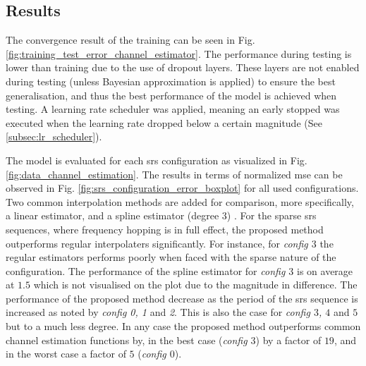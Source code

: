 


\subsection{Results}
The convergence result of the training can be seen in Fig. \ref{fig:training_test_error_channel_estimator}. The performance during testing is lower than training due to the use of dropout layers. These layers are not enabled during testing (unless Bayesian approximation is applied) to ensure the best generalisation, and thus the best performance of the model is achieved when testing. A learning rate scheduler was applied, meaning an early stopped was executed when the learning rate dropped below a certain magnitude (See \ref{subsec:lr_scheduler}).

The model is evaluated for each \gls{srs} configuration as visualized in Fig. \ref{fig:data_channel_estimation}. The results in terms of normalized \gls{mse} can be observed in Fig. \ref{fig:srs_configuration_error_boxplot} for all used configurations. Two common interpolation methods are added for comparison, more specifically, a linear estimator, and a spline estimator (degree $3$) \cite{2020SciPy-NMeth}.  For the sparse \gls{srs} sequences, where frequency hopping is in full effect, the proposed method outperforms regular interpolaters significantly. For instance, for \emph{config $3$} the regular estimators performs poorly when faced with the sparse nature of the configuration. The performance of the spline estimator for \emph{config $3$} is on average at $1.5$ which is not visualised on the plot due to the magnitude in difference. The performance of the proposed method decrease as the period of the \gls{srs} sequence is increased as noted by \emph{config 0, 1} and \emph{2}. This is also the case for \emph{config $3$, $4$} and $5$ but to a much less degree. In any case the proposed method outperforms common channel estimation functions by, in the best case (\emph{config $3$}) by a factor of $19$, and in the worst case a factor of $5$ (\emph{config $0$}).

